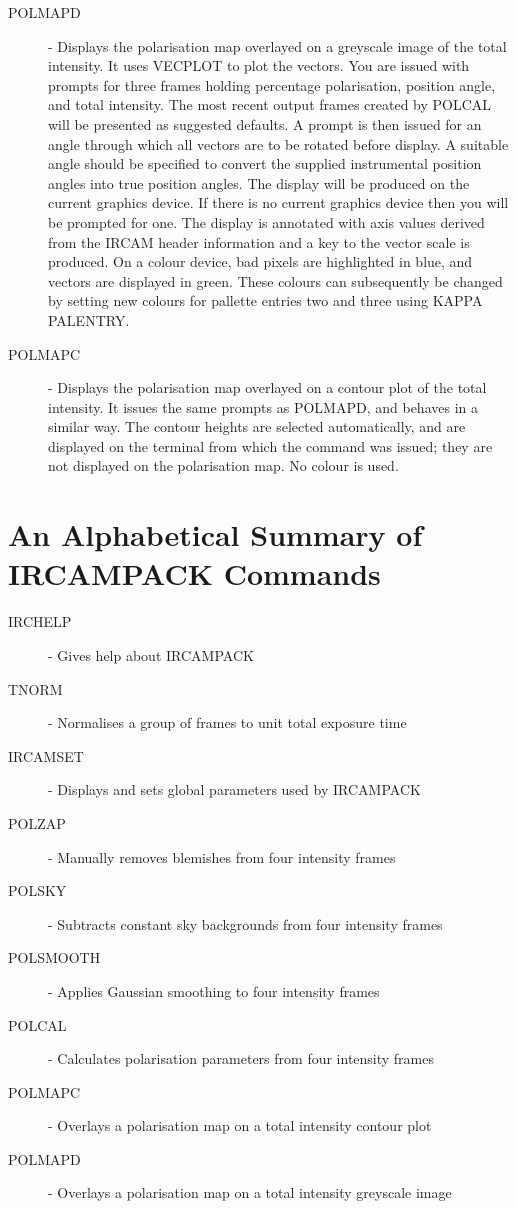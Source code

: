 \begin{description}
\item [POLMAPD] - Displays the polarisation map overlayed on a
greyscale image of the total intensity. It uses {\small VECPLOT} to
plot the vectors.  You are issued with prompts for three frames holding
percentage polarisation, position angle, and total intensity. The most
recent output frames created by {\small POLCAL} will be presented as
suggested defaults. A prompt is then issued for an angle through which
all vectors are to be rotated before display. A suitable angle should
be specified to convert the supplied instrumental position angles into
true position angles. The display will be produced on the current
graphics device. If there is no current graphics device then you will
be prompted for one. The display is annotated with axis values derived
from the {\small IRCAM} header information and a key to the vector
scale is produced. On a colour device, bad pixels are highlighted in
blue, and vectors are displayed in green. These colours can
subsequently be changed by setting new colours for pallette entries two
and three using {\small KAPPA PALENTRY}.

\item [POLMAPC] - Displays the polarisation map overlayed on a contour
plot of the total intensity. It issues the same prompts as {\small
POLMAPD}, and behaves in a similar way. The contour heights are
selected automatically, and are displayed on the terminal from which
the command was issued; they are not displayed on the polarisation map.
No colour is used.

\end{description}

\appendix
\newpage

\section{An Alphabetical Summary of IRCAMPACK Commands}

\begin{description}
\item [IRCHELP] - Gives help about {\small IRCAMPACK}
\item [TNORM] - Normalises a group of frames to unit total exposure time
\item [IRCAMSET] - Displays and sets global parameters used by {\small
IRCAMPACK}
\item [POLZAP] - Manually removes blemishes from four intensity frames
\item [POLSKY] - Subtracts constant sky backgrounds from four intensity frames
\item [POLSMOOTH] - Applies Gaussian smoothing to four intensity frames
\item [POLCAL] - Calculates polarisation parameters from four intensity frames
\item [POLMAPC] - Overlays a polarisation map on a total intensity contour plot
\item [POLMAPD] - Overlays a polarisation map on a total intensity greyscale
image
\end{description}

